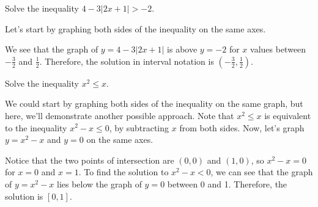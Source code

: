 \documentclass[noauthor, nooutcomes]{ximera}
\begin{document}
\begin{example}
Solve the inequality $4 - 3|2x + 1| > -2$.
\end{example}
\begin{explanation}
Let's start by graphing both sides of the inequality on the same axes. 
\begin{image}
\end{image}

We see that the graph of $y=4-3|2x+1|$ is above $y=-2$ for $x$ values between $-\frac{3}{2}$ and $\frac{1}{2}$. Therefore, the solution in interval notation is $\left(-\frac{3}{2}, \frac{1}{2}\right)$.
\end{explanation}

\begin{example}
Solve the inequality $x^2 \le x$.
\end{example}
\begin{explanation}
We could start by graphing both sides of the inequality on the same graph, but here, we'll demonstrate another possible approach. Note that $x^2 \le x$ is equivalent to the inequality $x^2 - x \le 0$, by subtracting $x$ from both sides. Now, let's graph $y = x^2 - x$ and $y = 0$ on the same axes.

\begin{image}
\end{image}

Notice that the two points of intersection are $(0, 0)$ and $(1, 0)$, so $x^2 - x = 0$ for $x = 0$ and $x = 1$. To find the solution to $x^2 - x < 0$, we can see that the graph of $y = x^2 - x$ lies below the graph of $y = 0$ between 0 and 1. Therefore, the solution is $[0, 1]$. 
\end{explanation}
\end{document}
